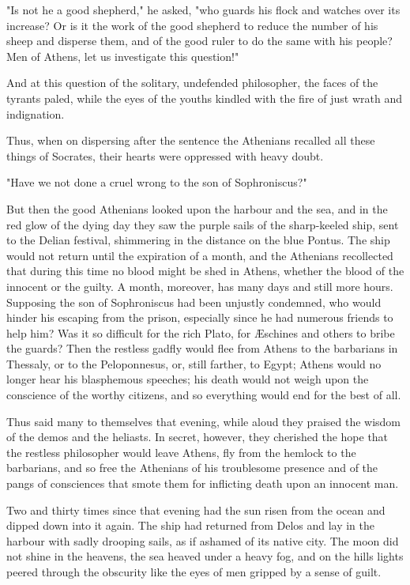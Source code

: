 "Is not he a good shepherd," he asked, "who guards his flock and
watches over its increase? Or is it the work of the good shepherd to
reduce the number of his sheep and disperse them, and of the good
ruler to do the same with his people? Men of Athens, let us
investigate this question!"

And at this question of the solitary, undefended philosopher, the
faces of the tyrants paled, while the eyes of the youths kindled with
the fire of just wrath and indignation.

Thus, when on dispersing after the sentence the Athenians recalled all
these things of Socrates, their hearts were oppressed with heavy
doubt.

"Have we not done a cruel wrong to the son of Sophroniscus?"

But then the good Athenians looked upon the harbour and the sea, and
in the red glow of the dying day they saw the purple sails of the
sharp-keeled ship, sent to the Delian festival, shimmering in the
distance on the blue Pontus. The ship would not return until the
expiration of a month, and the Athenians recollected that during this
time no blood might be shed in Athens, whether the blood of the
innocent or the guilty. A month, moreover, has many days and still
more hours. Supposing the son of Sophroniscus had been unjustly
condemned, who would hinder his escaping from the prison, especially
since he had numerous friends to help him? Was it so difficult for the
rich Plato, for Æschines and others to bribe the guards? Then the
restless gadfly would flee from Athens to the barbarians in Thessaly,
or to the Peloponnesus, or, still farther, to Egypt; Athens would no
longer hear his blasphemous speeches; his death would not weigh upon
the conscience of the worthy citizens, and so everything would end for
the best of all.

Thus said many to themselves that evening, while aloud they praised
the wisdom of the demos and the heliasts. In secret, however, they
cherished the hope that the restless philosopher would leave Athens,
fly from the hemlock to the barbarians, and so free the Athenians of
his troublesome presence and of the pangs of consciences that smote
them for inflicting death upon an innocent man.

Two and thirty times since that evening had the sun risen from the
ocean and dipped down into it again. The ship had returned from Delos
and lay in the harbour with sadly drooping sails, as if ashamed of its
native city. The moon did not shine in the heavens, the sea heaved
under a heavy fog, and on the hills lights peered through the
obscurity like the eyes of men gripped by a sense of guilt.

